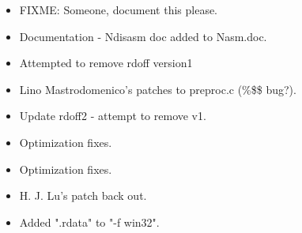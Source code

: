 
\begin{itemize}
    \item{FIXME: Someone, document this please.}
\end{itemize}


\begin{itemize}
    \item{Documentation - Ndisasm doc added to Nasm.doc.}
\end{itemize}


\begin{itemize}
    \item{Attempted to remove rdoff version1}
    \item{Lino Mastrodomenico's patches to preproc.c (\%\$\$ bug?).}
\end{itemize}



\begin{itemize}
    \item{Update rdoff2 - attempt to remove v1.}
\end{itemize}


\begin{itemize}
    \item{Optimization fixes.}
\end{itemize}


\begin{itemize}
    \item{Optimization fixes.}
\end{itemize}


\begin{itemize}
    \item{H. J. Lu's patch back out.}
\end{itemize}


\begin{itemize}
    \item{Added ".rdata" to "-f win32".}
\end{itemize}

